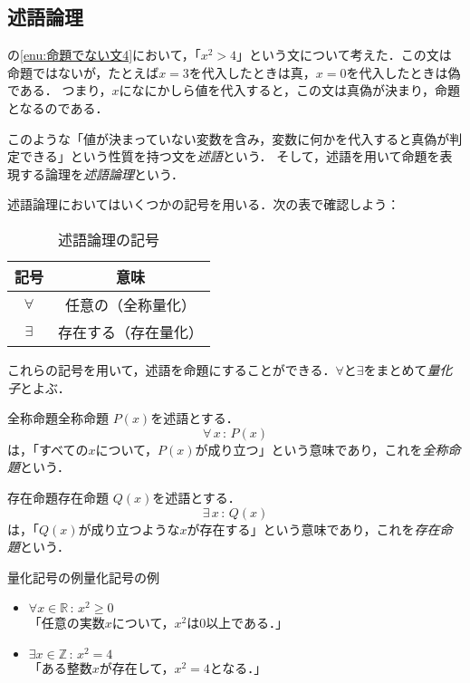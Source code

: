\subsection{述語論理}

の\ref{enu:命題でない文4}において，「$x^2 >4$」という文について考えた．この文は命題ではないが，たとえば$x=3$を代入したときは真，$x=0$を代入したときは偽である．
つまり，$x$になにかしら値を代入すると，この文は真偽が決まり，命題となるのである．

このような「値が決まっていない変数を含み，変数に何かを代入すると真偽が判定できる」という性質を持つ文を\emph{述語}という．
そして，述語を用いて命題を表現する論理を\emph{述語論理}という．


述語論理においてはいくつかの記号を用いる．次の表で確認しよう：

\begin{table}[ht]
  \centering
  \caption{述語論理の記号}
  \begin{tabular}{c|c}
    \hline
    記号        & 意味                              \\
    \hline
    $\forall$ & 任意の（全称量化\index{ぜんしょうりょうか@全称量化}） \\
    $\exists$ & 存在する（存在量化\index{そんざいりょうか@存在量化}） \\
    \hline
  \end{tabular}
\end{table}

これらの記号を用いて，述語を命題にすることができる．$\forall$と$\exists$をまとめて\emph{量化子}とよぶ．

\begin{definition}{全称命題}{全称命題}
  $P(x)$を述語とする．
  \[
    \forall\, x \, : \, P(x)
  \]
  は，「すべての$x$について，$P(x)$が成り立つ」という意味であり，これを\emph{全称命題}という．
\end{definition}

\begin{definition}{存在命題}{存在命題}
  $Q(x)$を述語とする．
  \[
    \exists \,  x\, : \, Q(x)
  \]
  は，「$Q(x)$が成り立つような$x$が存在する」という意味であり，これを\emph{存在命題}という．
\end{definition}

\begin{example}{量化記号の例}{量化記号の例}
  \begin{itemize}
    \item $\forall x \in \mathbb{R}\, : \, x^2 \geq 0$\\
          「任意の実数$x$について，$x^2$は$0$以上である．」
    \item $\exists x \in \mathbb{Z} \, : \, x^2 = 4$\\
          「ある整数$x$が存在して，$x^2 = 4$となる．」
  \end{itemize}
\end{example}


